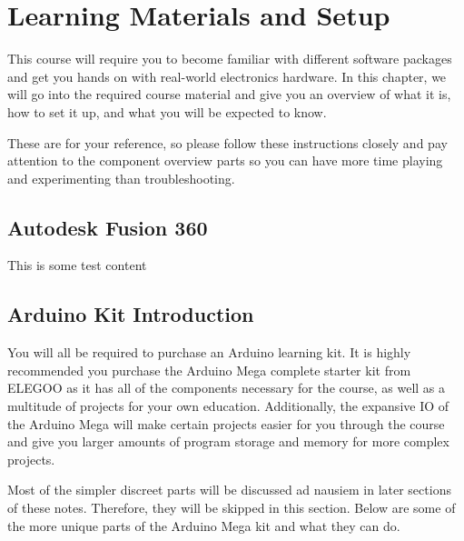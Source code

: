 %

\chapter*{Learning Materials and Setup}
\setchapterpreamble[u]{\margintoc}

This course will require you to become familiar with different software packages and get you hands on with real-world electronics hardware.
In this chapter, we will go into the required course material and give you an overview of what it is, how to set it up, and what you will be expected to know.

These are for your reference, so please follow these instructions closely and pay attention to the component overview parts so you can have more time playing and experimenting than troubleshooting.

\section*{Autodesk Fusion 360}
This is some test content

\section*{Arduino Kit Introduction}
You will all be required to purchase an Arduino learning kit. 
It is highly recommended you purchase the Arduino Mega complete starter kit from ELEGOO as it has all of the components necessary for the course, as well as a multitude of projects for your own education.
Additionally, the expansive IO of the Arduino Mega will make certain projects easier for you through the course and give you larger amounts of program storage and memory for more complex projects.

Most of the simpler discreet parts will be discussed ad nausiem in later sections of these notes.
Therefore, they will be skipped in this section.
Below are some of the more unique parts of the Arduino Mega kit and what they can do.
    
